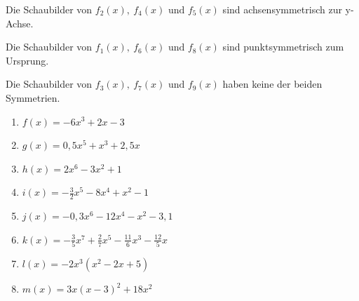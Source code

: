\textcolor{loes}{Die Schaubilder von \(f_2(x),\ f_4(x)\text{ und } f_5(x)\) sind achsensymmetrisch zur y-Achse.}

\textcolor{loes}{Die Schaubilder von \(f_1(x),\ f_6(x)\text{ und } f_8(x)\) sind punktsymmetrisch zum Ursprung.}

\textcolor{loes}{Die Schaubilder von \(f_3(x),\ f_7(x)\text{ und } f_9(x)\) haben keine der beiden Symmetrien.}
\newpage
\begin{Exercise}[title={Untersuche auf Symmetrie und gib den Grad der Funktion an.}, label=ganzSymA1]

	\begin{minipage}{\textwidth}
		\begin{minipage}{0.5\textwidth}
			\begin{enumerate}[label=\alph*)]
				\item \(f(x)=-6x^3+2x-3\)
				\item \(g(x)=0,5x^5+x^3+2,5x\)
				\item \(h(x)=2x^6-3x^2+1\)
				\item \(i(x)=-\frac{3}{2}x^5-8x^4+x^2-1\)
			\end{enumerate}
		\end{minipage}%
		\begin{minipage}{0.5\textwidth}
			\begin{enumerate}[label=\alph*)]
				\setcounter{enumi}{4}
				\item \(j(x)=-0,3x^6-12x^4-x^2-3,1\)
				\item \(k(x)=-\frac{3}{5}x^7+\frac{2}{7}x^5-\frac{11}{6}x^3-\frac{12}{5}x\)
				\item \(l(x)=-2x^3\left(x^2-2x+5\right)\)
				\item \(m(x)=3x\left(x-3\right)^2+18x^2\)
			\end{enumerate}
		\end{minipage}%
	\end{minipage}
\end{Exercise}
\newpage
